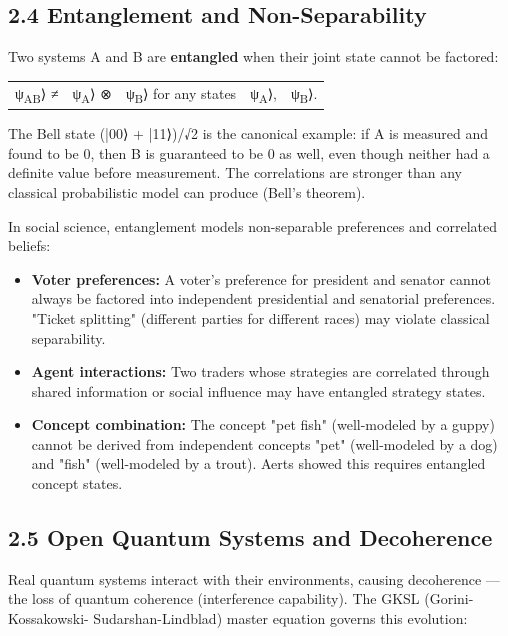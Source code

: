 \documentclass[11pt]{article}
\begin{document}
\subsection{2.4 Entanglement and Non-Separability}
\label{sec:org35b767f}

Two systems A and B are \textbf{entangled} when their joint state cannot be factored:
\begin{center}
\begin{tabular}{lllll}
ψ\textsubscript{AB}⟩ ≠ & ψ\textsubscript{A}⟩ ⊗ & ψ\textsubscript{B}⟩ for any states & ψ\textsubscript{A}⟩, & ψ\textsubscript{B}⟩.\\
\end{tabular}
\end{center}

The Bell state (|00⟩ + |11⟩)/√2 is the canonical example: if A is measured and
found to be 0, then B is guaranteed to be 0 as well, even though neither had a
definite value before measurement. The correlations are stronger than any
classical probabilistic model can produce (Bell's theorem).

In social science, entanglement models non-separable preferences and correlated
beliefs:
\begin{itemize}
\item \textbf{Voter preferences:} A voter's preference for president and senator cannot always
be factored into independent presidential and senatorial preferences. "Ticket
splitting" (different parties for different races) may violate classical
separability.
\item \textbf{Agent interactions:} Two traders whose strategies are correlated through shared
information or social influence may have entangled strategy states.
\item \textbf{Concept combination:} The concept "pet fish" (well-modeled by a guppy) cannot
be derived from independent concepts "pet" (well-modeled by a dog) and "fish"
(well-modeled by a trout). Aerts showed this requires entangled concept states.
\end{itemize}
\subsection{2.5 Open Quantum Systems and Decoherence}
\label{sec:orgf5dba0c}

Real quantum systems interact with their environments, causing decoherence --- the
loss of quantum coherence (interference capability). The GKSL (Gorini-Kossakowski-
Sudarshan-Lindblad) master equation governs this evolution:
\end{document}
